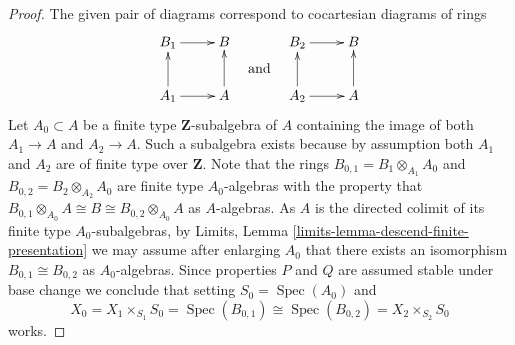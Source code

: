 \documentclass[10pt,a4paper]{amsart}
\theoremstyle{plain}
\theoremstyle{definition}
\theoremstyle{remark}
\numberwithin{equation}{subsection}
\def\Spec{\mathop{\mathrm{Spec}}}
\begin{document}
\begin{proof}
The given pair of diagrams correspond to cocartesian diagrams of rings
$$
\vcenter{
\xymatrix{
B_1 \ar[r] & B \\
A_1 \ar[u] \ar[r] & A \ar[u]
}
}
\quad\text{and}\quad
\vcenter{
\xymatrix{
B_2 \ar[r] & B \\
A_2 \ar[u] \ar[r] & A \ar[u]
}
}
$$
Let $A_0 \subset A$ be a finite type $\mathbf{Z}$-subalgebra of $A$
containing the image of both $A_1 \to A$ and $A_2 \to A$. Such a subalgebra
exists because by assumption both $A_1$ and $A_2$ are of finite type over
$\mathbf{Z}$. Note that the rings $B_{0, 1} = B_1 \otimes_{A_1} A_0$
and $B_{0, 2} = B_2 \otimes_{A_2} A_0$ are finite type $A_0$-algebras
with the property that
$B_{0, 1} \otimes_{A_0} A \cong B \cong B_{0, 2} \otimes_{A_0} A$
as $A$-algebras. As $A$ is the directed colimit of its finite type
$A_0$-subalgebras, by
Limits, Lemma \ref{limits-lemma-descend-finite-presentation}
we may assume after enlarging $A_0$ that there exists an isomorphism
$B_{0, 1} \cong B_{0, 2}$ as $A_0$-algebras. Since properties $P$ and $Q$
are assumed stable under base change we conclude that setting
$S_0 = \Spec(A_0)$ and
$$
X_0 = X_1 \times_{S_1} S_0 =
\Spec(B_{0, 1}) \cong \Spec(B_{0, 2}) = X_2 \times_{S_2} S_0
$$
works.
\end{proof}
\end{document}
